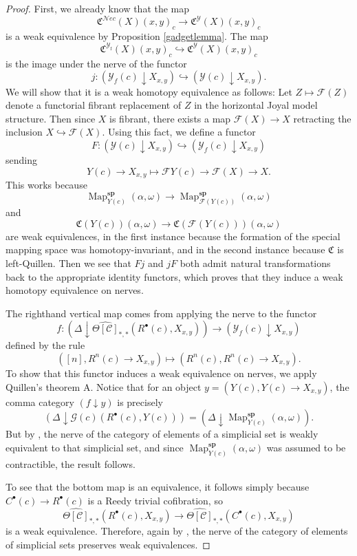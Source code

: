 \documentclass{amsart}
\numberwithin{equation}{section}
\theoremstyle{plain}   %
\theoremstyle{remark}
\theoremstyle{plain}
\newcommand{\Nec}{\ensuremath{{\mathcal{N}ec}}}
\newcommand{\overcat}[2]{{\left(#1\downarrow #2\right)}}
\DeclareMathOperator{\Map}{Map}
\newcommand{\cellset}{\ensuremath{\widehat{\Theta[\mathcal{C}]}}}
\begin{document}
\begin{proof}
	First, we already know that the map
	\[\mathfrak{C}^\Nec(X)(x,y)_c \to \mathfrak{C}^\mathcal{Y}(X)(x,y)_c\]
	is a weak equivalence by Proposition \ref{gadgetlemma}.  The map
	\[\mathfrak{C}^{\mathcal{Y}_\mathrm{f}}(X)(x,y)_c \hookrightarrow \mathfrak{C}^{\mathcal{Y}}(X)(x,y)_c\]
	is the image under the nerve of the functor
	\[j:\overcat{\mathcal{Y}_f(c)}{X_{x,y}} \hookrightarrow \overcat{\mathcal{Y}(c)}{X_{x,y}}.\]
	We will show that it is a weak homotopy equivalence as follows: Let \(Z\mapsto \mathscr{F}(Z)\) denote a functorial fibrant replacement of \(Z\) in the horizontal Joyal model structure. Then since \(X\) is fibrant, there exists a map \(\mathscr{F}(X)\to X\) retracting the inclusion \(X\hookrightarrow \mathscr{F}(X)\).  Using this fact, we define a functor
	\[F:\overcat{\mathcal{Y}(c)}{X_{x,y}} \hookrightarrow \overcat{\mathcal{Y}_f(c)}{X_{x,y}}\]
	sending \[Y(c)\to X_{x,y} \mapsto \mathscr{F}Y(c)\to \mathscr{F}(X) \to X.\]
	This works because
	\[\Map^\mathbf{sp}_{Y(c)}(\alpha,\omega)\to \Map^\mathbf{sp}_{\mathscr{F}(Y(c))}(\alpha,\omega)\]
	and
	\[\mathfrak{C}(Y(c))(\alpha,\omega)\to \mathfrak{C}(\mathscr{F}(Y(c)))(\alpha,\omega)\]
	are weak equivalences, in the first instance because the formation of the special mapping space was homotopy-invariant, and in the second instance because \(\mathfrak{C}\) is left-Quillen. Then we see that \(Fj\) and \(jF\) both admit natural transformations back to the appropriate identity functors, which proves that they induce a weak homotopy equivalence on nerves.

	The righthand vertical map comes from applying the nerve to the functor
	\[f:\overcat{\Delta}{\cellset_{\ast,\ast}(R^\bullet(c),X_{x,y})} \to \overcat{\mathcal{Y}_f(c)}{X_{x,y}}\]
	defined by the rule
	\[([n],R^n(c) \to X_{x,y}) \mapsto (R^n(c), R^n(c)\to X_{x,y}).\]
	To show that this functor induces a weak equivalence on nerves, we apply Quillen's theorem A.  Notice that for an object \(y=(Y(c),Y(c)\to X_{x,y})\), the comma category \(\overcat{f}{y}\) is precisely
	\[\overcat{\Delta}{\mathcal{G}(c)(R^\bullet(c),Y(c))}=\overcat{\Delta}{\Map^\mathbf{sp}_{Y(c)}(\alpha,\omega)}.\]
	But by \cite{ds2}, the nerve of the category of elements of a simplicial set is weakly equivalent to that simplicial set, and since \(\Map^\mathbf{sp}_{Y(c)}(\alpha,\omega)\) was assumed to be contractible, the result follows.

	To see that the bottom map is an equivalence, it follows simply because \(C^\bullet(c) \to R^\bullet(c)\) is a Reedy trivial cofibration, so
	\[\cellset_{\ast,\ast}(R^\bullet(c),X_{x,y})  \to \cellset_{\ast,\ast}(C^\bullet(c),X_{x,y})\]
	is a weak equivalence.  Therefore, again by \cite{ds2}, the nerve of the category of elements of simplicial sets preserves weak equivalences.
\end{proof}
\end{document}
